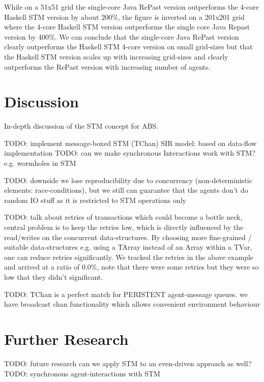 While on a 51x51 grid the single-core Java RePast version outperforms the 4-core Haskell STM version by about 200\%, the figure is inverted on a 201x201 grid where the 4-core Haskell STM version outperforms the single core Java Repast version by 400\%. We can conclude that the single-core Java RePast version clearly outperforms the Haskell STM 4-core version on small grid-sizes but that the Haskell STM version scales up with increasing grid-sizes and clearly outperforms the RePast version with increasing number of agents.

\section{Discussion}
\label{sect:stm_discussion}
In-depth discussion of the STM concept for ABS.


TODO: implement message-boxed STM (TChan) SIR model: based on data-flow implementation
TODO: can we make synchronous Interactions work with STM? e.g. wormholes in STM

TODO: downside we lose reproducibility due to concurrency (non-deterministic elements: race-conditions), but we still can guarantee that the agents don't do random IO stuff as it is restricted to STM operations only

TODO: talk about retries of transactions which could become a bottle neck, central problem is to keep the retries low, which is directly influenced by the read/writes on the concurrent data-structures. By choosing more fine-grained / suitable data-structures e.g. using a TArray instead of an Array within a TVar, one can reduce retries significantly. We tracked the retries in the above example and arrived at a ratio of 0.0\%, note that there were some retries but they were so low that they didn't significant.

TODO: TChan is a perfect match for PERISTENT agent-message queues. we have broadcast chan functionality which allows convenient environment behaviour

\section{Further Research}
\label{sect:stm_further}
TODO: future research can we apply STM to an even-driven approach as well?
TODO: synchronous agent-interactions with STM